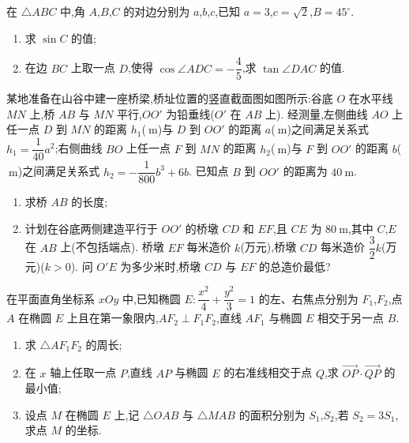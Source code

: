 \begin{problem}
在 \(\triangle ABC\) 中,角 \(A\),\(B\),\(C\) 的对边分别为 \(a\),\(b\),\(c\),已知 \(a=3\),\(c=\sqrt2\),\(B=45^\circ\).

\begin{enumerate}
\item 求 \(\sin C\) 的值;
\item 在边 \(BC\) 上取一点 \(D\),使得 \(\cos\angle ADC=-\dfrac45\),求 \(\tan\angle DAC\) 的值.
\end{enumerate}

\end{problem}

\begin{problem}
某地准备在山谷中建一座桥梁,桥址位置的竖直截面图如图所示:谷底 \(O\) 在水平线 \(MN\) 上,桥 \(AB\) 与 \(MN\) 平行,\(OO'\) 为铅垂线(\(O'\) 在 \(AB\) 上). 经测量,左侧曲线 \(AO\) 上任一点 \(D\) 到 \(MN\) 的距离 \(h_1\)(\(\mathrm{~m}\))与 \(D\) 到 \(OO'\) 的距离 \(a\)(\(\mathrm{~m}\))之间满足关系式 \(h_1=\dfrac{1}{40}a^2\);右侧曲线 \(BO\) 上任一点 \(F\) 到 \(MN\) 的距离 \(h_2\)(\(\mathrm{~m}\))与 \(F\) 到 \(OO'\) 的距离 \(b\)(\(\mathrm{~m}\))之间满足关系式 \(h_2=-\dfrac{1}{800}b^3+6b\). 已知点 \(B\) 到 \(OO'\) 的距离为 \(40\mathrm{~m}\).

\begin{enumerate}
\item 求桥 \(AB\) 的长度;
\item 计划在谷底两侧建造平行于 \(OO'\) 的桥墩 \(CD\) 和 \(EF\),且 \(CE\) 为 \(80\mathrm{~m}\),其中 \(C\),\(E\) 在 \(AB\) 上(不包括端点). 桥墩 \(EF\) 每米造价 \(k\)(万元),桥墩 \(CD\) 每米造价 \(\dfrac32k\)(万元)(\(k>0\)). 问 \(O'E\) 为多少米时,桥墩 \(CD\) 与 \(EF\) 的总造价最低?
\end{enumerate}

\end{problem}

\begin{problem}
在平面直角坐标系 \(xOy\) 中,已知椭圆 \(E:\dfrac{x^2}{4}+\dfrac{y^2}{3}=1\) 的左、右焦点分别为 \(F_1\),\(F_2\),点 \(A\) 在椭圆 \(E\) 上且在第一象限内,\(AF_2\perp F_1F_2\),直线 \(AF_1\) 与椭圆 \(E\) 相交于另一点 \(B\).

\begin{enumerate}
\item 求 \(\triangle AF_1F_2\) 的周长;
\item 在 \(x\) 轴上任取一点 \(P\),直线 \(AP\) 与椭圆 \(E\) 的右准线相交于点 \(Q\),求 \(\overrightarrow{OP}\cdot\overrightarrow{QP}\) 的最小值;
\item 设点 \(M\) 在椭圆 \(E\) 上,记 \(\triangle OAB\) 与 \(\triangle MAB\) 的面积分别为 \(S_1\),\(S_2\),若 \(S_2=3S_1\),求点 \(M\) 的坐标.
\end{enumerate}

\end{problem}


